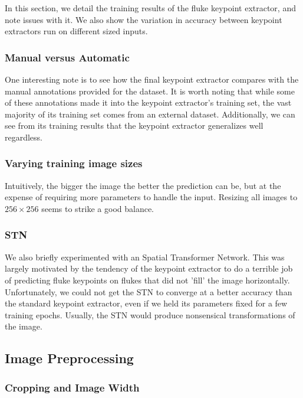In this section, we detail the training results of the fluke keypoint extractor, and note issues with it.
We also show the variation in accuracy between keypoint extractors run on different sized inputs.

\subsubsection{Manual versus Automatic}

One interesting note is to see how the final keypoint extractor compares with the manual annotations provided for the dataset.
It is worth noting that while some of these annotations made it into the keypoint extractor's training set, the vast majority of its training set comes from an external dataset.
Additionally, we can see from its training results that the keypoint extractor generalizes well regardless.

\subsubsection{Varying training image sizes}

Intuitively, the bigger the image the better the prediction can be, but at the expense of requiring more parameters to handle the input.
Resizing all images to $256 \times 256$ seems to strike a good balance.

\subsubsection{STN} %

We also briefly experimented with an Spatial Transformer Network.
This was largely motivated by the tendency of the keypoint extractor to do a terrible job of predicting fluke keypoints on flukes that did not 'fill' the image horizontally.
Unfortunately, we could not get the STN to converge at a better accuracy than the standard keypoint extractor, even if we held its parameters fixed for a few training epochs.
Usually, the STN would produce nonsensical transformations of the image.


\subsection{Image Preprocessing}

\subsubsection{Cropping and Image Width}

